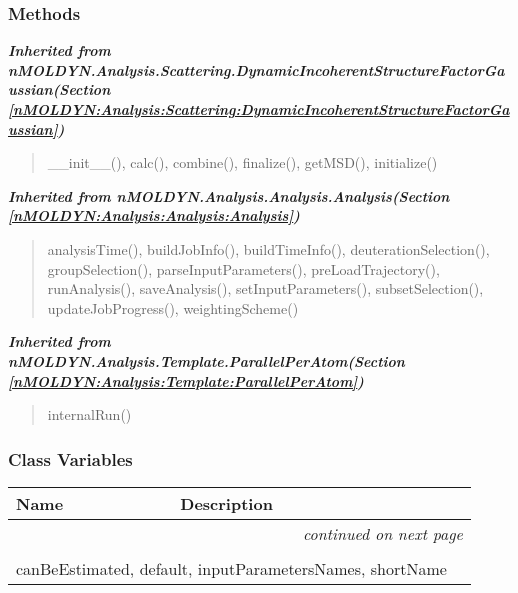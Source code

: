 
  \subsubsection{Methods}


\large{\textbf{\textit{Inherited from nMOLDYN.Analysis.Scattering.DynamicIncoherentStructureFactorGaussian\textit{(Section \ref{nMOLDYN:Analysis:Scattering:DynamicIncoherentStructureFactorGaussian})}}}}

\begin{quote}
\_\_init\_\_(), calc(), combine(), finalize(), getMSD(), initialize()
\end{quote}

\large{\textbf{\textit{Inherited from nMOLDYN.Analysis.Analysis.Analysis\textit{(Section \ref{nMOLDYN:Analysis:Analysis:Analysis})}}}}

\begin{quote}
analysisTime(), buildJobInfo(), buildTimeInfo(), deuterationSelection(), groupSelection(), parseInputParameters(), preLoadTrajectory(), runAnalysis(), saveAnalysis(), setInputParameters(), subsetSelection(), updateJobProgress(), weightingScheme()
\end{quote}

\large{\textbf{\textit{Inherited from nMOLDYN.Analysis.Template.ParallelPerAtom\textit{(Section \ref{nMOLDYN:Analysis:Template:ParallelPerAtom})}}}}

\begin{quote}
internalRun()
\end{quote}


  \subsubsection{Class Variables}

    \vspace{-1cm}
\hspace{\varindent}\begin{longtable}{|p{\varnamewidth}|p{\vardescrwidth}|l}
\cline{1-2}
\cline{1-2} \centering \textbf{Name} & \centering \textbf{Description}& \\
\cline{1-2}
\endhead\cline{1-2}\multicolumn{3}{r}{\small\textit{continued on next page}}\\\endfoot\cline{1-2}
\endlastfoot\multicolumn{2}{|l|}{\textit{Inherited from nMOLDYN.Analysis.Scattering.DynamicIncoherentStructureFactorGaussian \textit{(Section \ref{nMOLDYN:Analysis:Scattering:DynamicIncoherentStructureFactorGaussian})}}}\\
\multicolumn{2}{|p{\varwidth}|}{\raggedright canBeEstimated, default, inputParametersNames, shortName}\\
\cline{1-2}
\end{longtable}

